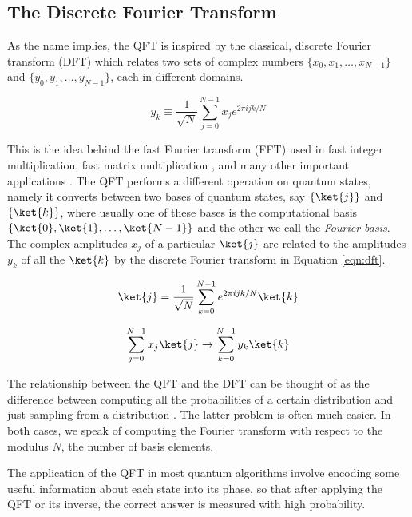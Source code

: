 \subsection{The Discrete Fourier Transform}

As the name implies, the QFT is inspired by the classical, discrete
Fourier transform (DFT) which relates two sets of complex numbers
$\{x_0, x_1, \ldots, x_{N-1}\}$ and $\{y_0, y_1, \ldots, y_{N-1}\}$,
each in different domains.

\begin{equation}
y_k \equiv \frac{1}{\sqrt{N}} \sum_{j=0}^{N-1} x_j e^{2\pi i j k / N}
\label{eqn:dft}
\end{equation}

This is the idea behind the fast Fourier transform (FFT) \cite{Cooley1965}
used in fast
integer multiplication, fast matrix multiplication \cite{Schoenhage1971},
and many other
important applications \cite{Maslen1997}. The QFT performs a different
operation on quantum states, namely it converts between two bases of
quantum states,
say $\{\ket{j}\}$ and $\{\ket{k}\}$, where usually one of these bases is
the computational basis $\{\ket{0}, \ket{1}, \ldots, \ket{N-1}\}$
and the other we call the \emph{Fourier basis}. The complex amplitudes
$x_j$ of a
particular $\ket{j}$ are related to the amplitudes $y_k$ of all the $\ket{k}$
by the discrete Fourier transform in Equation \ref{eqn:dft}.

\begin{equation}
\ket{j} = \frac{1}{\sqrt{N}} \sum_{k=0}^{N-1} e^{2\pi i j k / N} \ket{k}
\end{equation}

\begin{equation}
\sum_{j=0}^{N-1} x_j \ket{j} \rightarrow \sum_{k=0}^{N-1} y_k \ket{k}
\end{equation}

The relationship between the QFT and the DFT can be thought of as the
difference between computing all the probabilities of a certain distribution
and just sampling from a distribution \cite{Cleve2000}. The latter problem is
often much easier. In both cases, we speak of computing the Fourier transform
with respect to the modulus $N$, the number of basis elements.

The application of the QFT in most quantum algorithms
involve encoding some useful information about each state into its phase,
so that after applying the QFT or its inverse, the correct answer is measured
with high probability.

